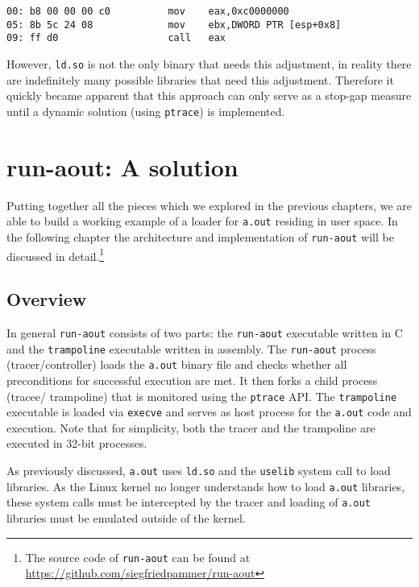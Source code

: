 \documentclass[draft,final]{vutinfth} %
\begin{document}
\begin{lstlisting}[caption={A possible patch replacing the system call with a call to our custom handler located at (for example) \texttt{0xc000\_0000}}, label={lst:asm_custom_uselib}]
00:	b8 00 00 00 c0       	mov    eax,0xc0000000
05:	8b 5c 24 08          	mov    ebx,DWORD PTR [esp+0x8]
09:	ff d0                	call   eax
\end{lstlisting}

However, \texttt{ld.so} is not the only binary that needs this adjustment, in reality there are indefinitely many possible libraries that need this adjustment. Therefore it quickly became apparent that this approach can only serve as a stop-gap measure until a dynamic solution (using \texttt{ptrace}) is implemented.

\chapter{run-aout: A solution}
\label{solution}

Putting together all the pieces which we explored in the previous chapters, we are able to build a working example of a loader for \texttt{a.out} residing in user space. In the following chapter the architecture and implementation of \texttt{run-aout} will be discussed in detail.\footnote{The source code of \texttt{run-aout} can be found at \url{https://github.com/siegfriedpammer/run-aout}}

\section{Overview}
\label{solution_overview}

In general \texttt{run-aout} consists of two parts: the \texttt{run-aout} executable written in C and the \texttt{trampoline} executable written in assembly. The \texttt{run-aout} process (tracer/controller) loads the \texttt{a.out} binary file and checks whether all preconditions for successful execution are met. It then forks a child process (tracee/ trampoline) that is monitored using the \texttt{ptrace} API. The \texttt{trampoline} executable is loaded via \texttt{execve} and serves as host process for the \texttt{a.out} code and execution. Note that for simplicity, both the tracer and the trampoline are executed in 32-bit processes.

As previously discussed, \texttt{a.out} uses \texttt{ld.so} and the \texttt{uselib} system call to load libraries. As the Linux kernel no longer understands how to load \texttt{a.out} libraries, these system calls must be intercepted by the tracer and loading of \texttt{a.out} libraries must be emulated outside of the kernel.
\end{document}
